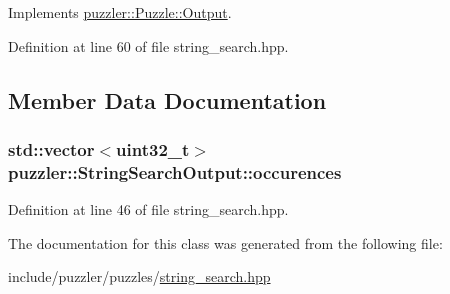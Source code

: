 Implements \hyperlink{a00023_a6f38b053870861fd4afe8819174c4d3d}{puzzler\+::\+Puzzle\+::\+Output}.



Definition at line 60 of file string\+\_\+search.\+hpp.



\subsection{Member Data Documentation}
\hypertarget{a00033_aab47434ea6516a925dce019171a60049}{}
\subsubsection[{occurences}]{\setlength{\rightskip}{0pt plus 5cm}std\+::vector$<$uint32\+\_\+t$>$ puzzler\+::\+String\+Search\+Output\+::occurences}\label{a00033_aab47434ea6516a925dce019171a60049}


Definition at line 46 of file string\+\_\+search.\+hpp.



The documentation for this class was generated from the following file\+:\begin{DoxyCompactItemize}
\item 
include/puzzler/puzzles/\hyperlink{a00133}{string\+\_\+search.\+hpp}\end{DoxyCompactItemize}
